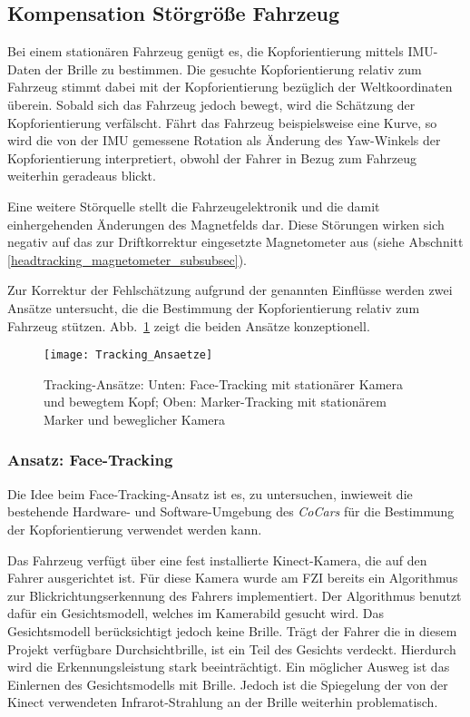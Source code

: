 
\subsection{Kompensation Störgröße Fahrzeug}
\label{headtracking_marker_subsec}

Bei einem stationären Fahrzeug genügt es, die Kopforientierung mittels \ac{IMU}-Daten der Brille zu bestimmen.
Die gesuchte Kopforientierung relativ zum Fahrzeug stimmt dabei mit der Kopforientierung bezüglich der Weltkoordinaten überein.
Sobald sich das Fahrzeug jedoch bewegt, wird die Schätzung der Kopforientierung verfälscht.
Fährt das Fahrzeug beispielsweise eine Kurve, so wird die von der IMU gemessene Rotation als Änderung des Yaw-Winkels der Kopforientierung interpretiert, obwohl der Fahrer in Bezug zum Fahrzeug weiterhin geradeaus blickt.

Eine weitere Störquelle stellt die Fahrzeugelektronik und die damit einhergehenden Änderungen des Magnetfelds dar.
Diese Störungen wirken sich negativ auf das zur Driftkorrektur eingesetzte Magnetometer aus (siehe Abschnitt \ref{headtracking_magnetometer_subsubsec}).

Zur Korrektur der Fehlschätzung aufgrund der genannten Einflüsse werden zwei Ansätze untersucht, die die Bestimmung der Kopforientierung relativ zum Fahrzeug stützen.
Abb.~\ref{fig:tracking_ansaetze} zeigt die beiden Ansätze konzeptionell.

\begin{figure}[h]
  \centering
  \texttt{[image: Tracking\_Ansaetze]}
  \caption{Tracking-Ansätze: Unten: Face-Tracking mit stationärer Kamera und bewegtem Kopf; Oben: Marker-Tracking mit stationärem Marker und beweglicher Kamera }
  \label{fig:tracking_ansaetze}
\end{figure}


\subsubsection{Ansatz: Face-Tracking}
\label{headtracking_facetracking_subsubsec}

Die Idee beim Face-Tracking-Ansatz ist es, zu untersuchen, inwieweit die bestehende Hardware- und Software-Umgebung des \emph{CoCars} für die Bestimmung der Kopforientierung verwendet werden kann.

Das Fahrzeug verfügt über eine fest installierte Kinect-Kamera, die auf den Fahrer ausgerichtet ist.
Für diese Kamera wurde am \ac{FZI} bereits ein Algorithmus zur Blickrichtungserkennung des Fahrers implementiert.
Der Algorithmus benutzt dafür ein Gesichtsmodell, welches im Kamerabild gesucht wird.
Das Gesichtsmodell berücksichtigt jedoch keine Brille.
Trägt der Fahrer die in diesem Projekt verfügbare Durchsichtbrille, ist ein Teil des Gesichts verdeckt.
Hierdurch wird die Erkennungsleistung stark beeinträchtigt.
Ein möglicher Ausweg ist das Einlernen des Gesichtsmodells mit Brille.
Jedoch ist die Spiegelung der von der Kinect verwendeten Infrarot-Strahlung an der Brille weiterhin problematisch.

